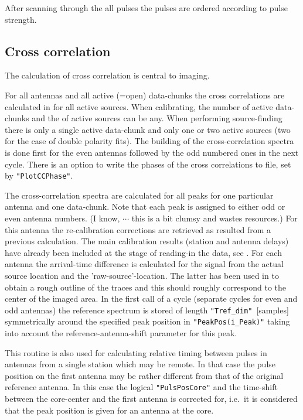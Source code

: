 After scanning through the all pulses the pulses are ordered according to pulse strength.


\subsection{Cross correlation}

The calculation of cross correlation is central to imaging.

For all antennas and all active (=open) data-chunks the cross correlations are calculated in  for all active sources. When calibrating, the number of active data-chunks and the of active sources can be any. When performing source-finding there is only a single active data-chunk and only one or two active sources (two for the case of double polarity fits). The building of the cross-correlation spectra is done first for the even antennas followed by the odd numbered ones in the next cycle. There is an option to write the phases of the cross correlations to file, set by \verb!"PlotCCPhase"!.

The cross-correlation spectra are calculated for all peaks for one particular antenna and one data-chunk. Note that each peak is assigned to either odd or even antenna numbers. (I know, $\cdots$ this is a bit clumsy and wastes resources.) For this antenna the re-calibration corrections are retrieved as resulted from a previous calculation. The main calibration results (station and antenna delays) have already been included at the stage of reading-in the data, see . For each antenna the arrival-time difference is calculated for the signal from the actual source location and the 'raw-source'-location. The latter has been used in  to  obtain a rough outline of the traces and this should roughly correspond to the center of the imaged area. In the first call of a cycle (separate cycles for even and odd antennas) the reference spectrum is stored of length \verb!"Tref_dim"!~[samples] symmetrically around the specified peak position in \verb!"PeakPos(i_Peak)"! taking into account the reference-antenna-shift parameter for this peak.

This routine is also used for calculating relative timing between pulses in antennas from a single station which may be remote. In that case the pulse position on the first antenna may be rather different from that of the original reference antenna. In this case the logical \verb!"PulsPosCore"! and the time-shift between the core-center and the first antenna is corrected for, i.e.\ it is considered that the peak position is given for an antenna at the core.

